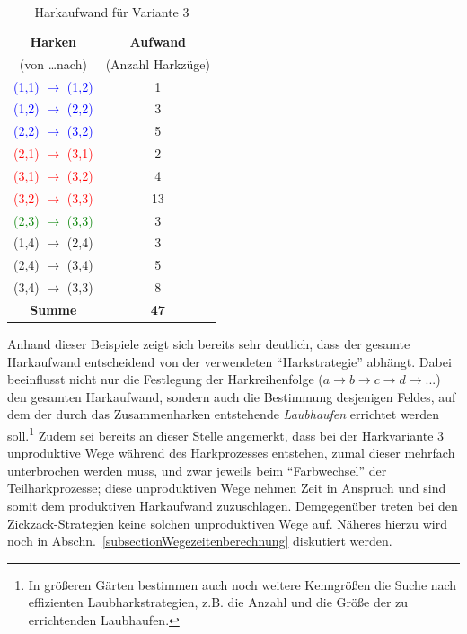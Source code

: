 \documentclass[fontsize=12pt,doubleside,openany,listof=totoc,listof=flat,listof=nochaptergap,numbers=noenddot]{scrbook}
\theoremstyle{style}
\begin{document}
\renewcommand{\arraystretch}{1}
\begin{table}[H]
\caption{Harkaufwand für Variante 3}
\label{HJKmlp_table_Variante3}
\centering 
\begin{scriptsize}
\begin{tabular}{|>{}c|>{}c|}
\hline
\textbf{Harken} & \textbf{Aufwand}\\
(von \ldots nach) & (Anzahl Harkzüge)\\
\hline
\textcolor{blue}{(1,1) $\rightarrow$ (1,2)} & 1\\
\hline
\textcolor{blue}{(1,2) $\rightarrow$ (2,2)} & 3\\
\hline
\textcolor{blue}{(2,2) $\rightarrow$ (3,2)} & 5\\
\hline
\textcolor{red}{(2,1) $\rightarrow$ (3,1)} & 2\\
\hline
\textcolor{red}{(3,1) $\rightarrow$ (3,2)} & 4\\
\hline
\textcolor{red}{(3,2) $\rightarrow$ (3,3)} & 13\\
\hline
\textcolor{green}{(2,3) $\rightarrow$ (3,3)} & 3\\
\hline
\textcolor{yellow!20!brown}{(1,4) $\rightarrow$ (2,4)} & 3\\
\hline
\textcolor{yellow!20!brown}{(2,4) $\rightarrow$ (3,4)} & 5\\
\hline
\textcolor{yellow!20!brown}{(3,4) $\rightarrow$ (3,3)} & 8\\
\hline
\textbf{Summe} & \textbf{47}\\
\hline
\end{tabular}
\end{scriptsize} 
\end{table}
\renewcommand{\arraystretch}{1}
	 	 
\noindent Anhand dieser Beispiele zeigt sich bereits sehr deutlich, dass der gesamte 
Harkaufwand entscheidend von der verwendeten "`Harkstrategie"' abhängt. 
Dabei beeinflusst nicht nur die Festlegung der Harkreihenfolge 
($a \rightarrow b \rightarrow c \rightarrow d \rightarrow ...$) den 
gesamten Harkaufwand, sondern auch die Bestimmung 
desjenigen Feldes, auf dem der durch das Zusammenharken entstehende 
\textit{Laubhaufen} errichtet werden soll.\footnote{In größeren Gärten 
bestimmen auch noch weitere Kenngrößen die Suche nach effizienten 
Laubharkstrategien, z.B. die Anzahl und die Größe der zu errichtenden 
Laubhaufen.} Zudem sei bereits an dieser Stelle angemerkt, dass bei der Harkvariante 3 unproduktive Wege während des Harkprozesses entstehen, zumal dieser mehrfach unterbrochen werden muss, und zwar jeweils beim "`Farbwechsel"' der Teilharkprozesse; diese unproduktiven Wege nehmen Zeit in Anspruch und sind somit dem produktiven Harkaufwand zuzuschlagen. Demgegenüber treten bei den Zickzack-Strategien keine solchen unproduktiven Wege auf. Näheres hierzu wird noch in Abschn.~\ref{subsectionWegezeitenberechnung} diskutiert werden.
\end{document}
